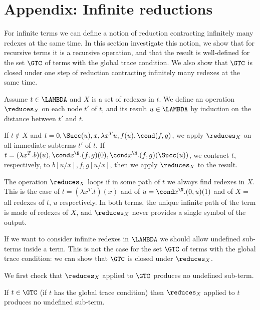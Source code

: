 \section{Appendix: Infinite reductions}
\label{section-infinite-reductions}
For infinite terms we can define a notion of reduction contracting infinitely many redexes at the same time.
In this section investigate this notion, 
we show that for recursive terms it is a recursive operation, and that the result
is well-defined for the set $\GTC$ of terms with the global trace condition. 
We also show that $\GTC$ is closed under one step 
of reduction contracting infinitely many redexes at the same time.

Assume $t \in \LAMBDA$ and $X$ is a set of redexes in $t$. We define an operation $\reduces_X$ 
on each node $t'$ of $t$, and its result $u \in \LAMBDA$ by induction on the distance between
$t'$ and $t$.

If $t \not \in X$ and $t=0,\Succ(u), x, \lambda x^Tu, f(u), \cond(f,g)$, we apply $\reduces_X$
on all immediate subterms $t'$ of $t$. If $t = (\lambda x^T.b)(u), \cond x^\N.(f,g)(0), \cond x^\N.(f,g)(\Succ(u))$,
we contract $t$, respectively, to $b[u/x], f, g[u/x]$, then we apply $\reduces_X$ to the result.

The operation $\reduces_X$ loops if in some path of $t$ we always find redexes in $X$. This is the case of 
$t = (\lambda x^T.t)(x)$ and of $u=\cond x^\N.(0,u)(1)$ and of $X=$ all redexes of $t$, $u$ respectively. 
In both terms, the unique infinite path of the term is made of redexes of $X$, and $\reduces_X$ never
provides a single symbol of the output.

If we want to consider infinite redexes in $\LAMBDA$ we should allow undefined sub-terms inside a term.
This is not the case for the set $\GTC$ of terms with the global trace condition:
we can show that $\GTC$ is closed under $\reduces_X$.

We first check that $\reduces_X$ applied to $\GTC$ produces no undefined sub-term.

\begin{lemma}
If $t \in \GTC$ (if $t$ has the global trace condition)
then $\reduces_X$ applied to $t$ produces no undefined sub-term.
\end{lemma}

